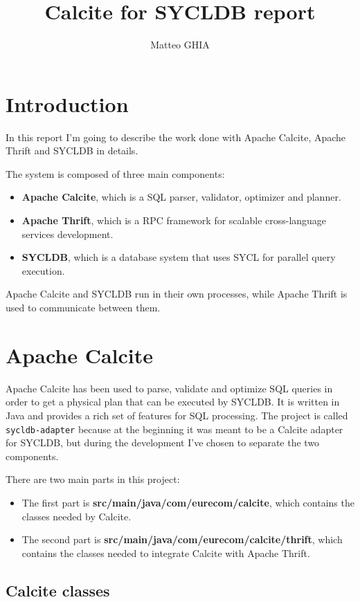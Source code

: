 \documentclass[a4paper, 10pt]{article}
\title{Calcite for SYCLDB report}
\author{Matteo GHIA}
\begin{document}
\maketitle

\section{Introduction}

In this report I'm going to describe the work done with Apache Calcite, Apache Thrift and SYCLDB in details.

The system is composed of three main components:
\begin{itemize}
    \item \textbf{Apache Calcite}, which is a SQL parser, validator, optimizer and planner.
    \item \textbf{Apache Thrift}, which is a RPC framework for scalable cross-language services development.
    \item \textbf{SYCLDB}, which is a database system that uses SYCL for parallel query execution.
\end{itemize}
Apache Calcite and SYCLDB run in their own processes, while Apache Thrift is used to communicate between them.

\section{Apache Calcite}

Apache Calcite has been used to parse, validate and optimize SQL queries in order to get a physical plan that can be executed by SYCLDB. It is written in Java and provides a rich set of features for SQL processing. The project is called \texttt{sycldb-adapter} because at the beginning it was meant to be a Calcite adapter for SYCLDB, but during the development I've chosen to separate the two components.

There are two main parts in this project:
\begin{itemize}
    \item The first part is \textbf{src/main/java/com/eurecom/calcite}, which contains the classes needed by Calcite.
    \item The second part is \textbf{src/main/java/com/eurecom/calcite/thrift}, which contains the classes needed to integrate Calcite with Apache Thrift.
\end{itemize}

\subsection{Calcite classes}
\end{document}
